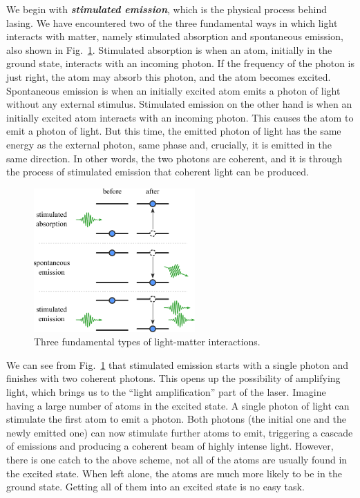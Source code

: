 We begin with \textit{\textbf{stimulated emission}}, which is the physical process behind lasing.
We have encountered two of the three fundamental ways in which light interacts with matter, namely stimulated absorption and spontaneous emission, also shown in Fig.~\ref{fig:5-3_light_matter_interaction}.
Stimulated absorption is when an atom, initially in the ground state, interacts with an incoming photon. If the frequency of the photon is just right, the atom may absorb this photon, and the atom becomes excited.
Spontaneous emission is when an initially excited atom emits a photon of light without any external stimulus.
Stimulated emission on the other hand is when an initially excited atom interacts with an incoming photon.
This causes the atom to emit a photon of light.
But this time, the emitted photon of light has the same energy as the external photon, same phase and, crucially, it is emitted in the same direction.
In other words, the two photons are coherent, and it is through the process of stimulated emission that coherent light can be produced.

\begin{figure}[t]
    \centering
    \includegraphics[width=0.55\textwidth]{lesson5/5-3_three_interactions.pdf}
    \caption[Light-matter interactions]{Three fundamental types of light-matter interactions.}
    \label{fig:5-3_light_matter_interaction}
\end{figure}

We can see from Fig.~\ref{fig:5-3_light_matter_interaction} that stimulated emission starts with a single photon and finishes with two coherent photons.
This opens up the possibility of amplifying light, which brings us to the ``light amplification'' part of the laser.
Imagine having a large number of atoms in the excited state.
A single photon of light can stimulate the first atom to emit a photon.
Both photons (the initial one and the newly emitted one) can now stimulate further atoms to emit, triggering a cascade of emissions and producing a coherent beam of highly intense light. 
However, there is one catch to the above scheme, not all of the atoms are usually found in the excited state.
When left alone, the atoms are much more likely to be in the ground state.
Getting all of them into an excited state is no easy task.


